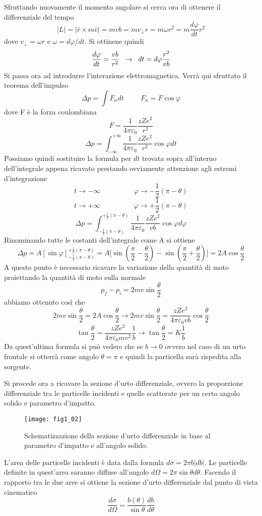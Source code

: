 Sfruttando nuovamente il momento angolare si cerca ora di ottenere il differenziale del tempo
\[|L|=|\bar r \times m\bar v|=mvb=mv_\perp r=m\omega r^2=m\frac{d\varphi}{dt}r^2\]
dove $v_\perp=\omega r$ e $\omega=d\varphi/dt$. 
Si ottinene quindi
\[\frac{d\varphi}{dt}=\frac{vb}{r^2}\hspace{0.2cm}\to\hspace{0.2cm} dt=d\varphi \frac{r^2}{vb}\]
Si passa ora ad introdurre l'interazione elettromagnetica. 
Verrà qui sfruttato il teorema dell'impulso
\[\Delta p=\int F_n dt\hspace{1cm}F_n=F\cos\varphi\]
dove F è la forza coulombiana
\[F=\frac{1}{4\pi\varepsilon_0}\frac{zZe^2}{r^2}\]
\[\Delta p=\int_{-\infty}^{+\infty} \frac{1}{4\pi\varepsilon_0}\frac{zZe^2}{r^2}\cos\varphi dt\]
Possiamo quindi sostituire la formula per $dt$ trovata sopra all'interno dell'integrale appena ricavato prestando ovviamente attenzione agli estremi d'integrazione 
\[t\to -\infty\hspace{2cm}\varphi\to-\frac{1}{2}(\pi-\theta)\]
\[t\to +\infty\hspace{2cm}\varphi\to+\frac{1}{2}(\pi-\theta)\]
\[\Delta p=\int _{-\frac{1}{2}(\pi-\theta)}^{+\frac{1}{2}(\pi-\theta)}\frac{1}{4\pi\varepsilon_0}\frac{zZe^2}{vb}\cos\varphi d\varphi\]
Rinominando tutte le costanti dell'integrale come A si ottiene
\[\Delta p=A[\sin\varphi] _{-\frac{1}{2}(\pi-\theta)}^{+\frac{1}{2}(\pi-\theta)}=A\biggl[\sin\left(\frac{\pi}{2}-\frac{\theta}{2}\right)-\sin\left(\frac{\pi}{2}+\frac{\theta}{2}\right)\biggl]=2A\cos\frac{\theta}{2}\]
A questo punto è necessario ricavare la variazione della quantità di moto proiettando la quantità di moto sulla normale
\[p_f-p_i=2mv\sin\frac{\theta}{2}\]
abbiamo ottenuto così che
\[2mv\sin\frac{\theta}{2}=2A\cos\frac{\theta}{2}\to 2mv\sin\frac{\theta}{2}=\frac{zZe^2}{4\pi \varepsilon_0vb}\cos\frac{\theta}{2}\]
\[\tan\frac{\theta}{2}=\frac{zZe^2}{4\pi\varepsilon_0mv^2}\frac{1}{b}\to\tan\frac{\theta}{2}=K\frac{1}{b}\]
Da quest'ultima formula si può vedere che se $b\to0$ ovvero nel caso di un urto frontale si otterrà come angolo $\theta=\pi$ e quindi la particella sarà rispedita alla sorgente.

Si procede ora a ricavare la sezione d'urto differenziale, ovvero la proporzione differenziale tra le particelle incidenti e quelle scatterate per un certo angolo solido e parametro d'impatto. 
\begin{figure}[h]
\centering
\texttt{[image: fig1\_02]}
\caption{Schematizzazione della sezione d'urto differenziale in base al parametro d'impatto e all'angolo solido.}
\label{fig:1.2}
\end{figure}
L'area delle particelle incidenti è data dalla formula $d\sigma=2\pi b |db|$. 
Le particelle definite in quest'area saranno diffuse all'angolo $d\Omega =2\pi \sin\theta d\theta$. 
Facendo il rapporto tra le due aree si ottiene la sezione d'urto differenziale dal punto di vista cinematico
\[\frac{d\sigma}{d\Omega}=\frac{b(\theta)}{\sin\theta}\frac{db}{d\theta}\]

